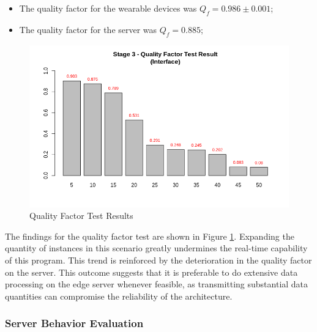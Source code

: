 \begin{itemize}
    \item The quality factor for the wearable devices was $Q_f = 0.986 \pm 0.001$;
    \item The quality factor for the server was $Q_f = 0.885$;
\end{itemize}

\begin{figure}[h!]
    \centering
    \includegraphics[width=.7\linewidth]{Figures/qf-s3.png}
    \caption{Quality Factor Test Results}
    \label{fig:qf-s3}
\end{figure}

The findings for the quality factor test are shown in Figure \ref{fig:qf-s3}. Expanding the quantity of instances in this scenario greatly undermines the real-time capability of this program. This trend is reinforced by the deterioration in the quality factor on the server. This outcome suggests that it is preferable to do extensive data processing on the edge server whenever feasible, as transmitting substantial data quantities can compromise the reliability of the architecture.

\subsubsection{Server Behavior Evaluation}

